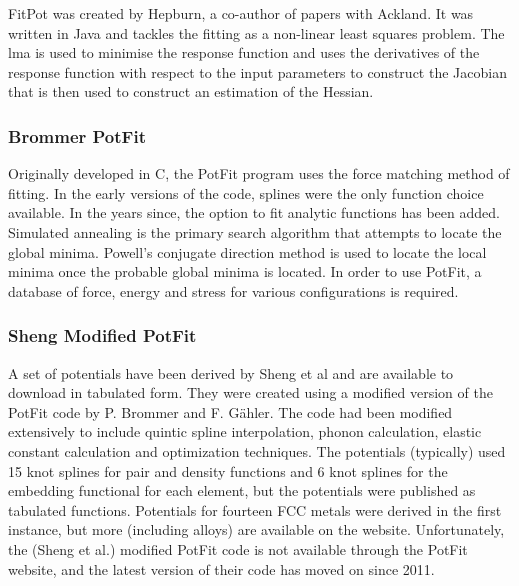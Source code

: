 FitPot was created by Hepburn, a co-author of papers with Ackland\cite{hepburnfec}.  It was written in Java and tackles the fitting as a non-linear least squares problem.  The \acrfull{lma} is used to minimise the response function and uses the derivatives of the response function with respect to the input parameters to construct the Jacobian that is then used to construct an estimation of the Hessian.


\subsubsection{Brommer PotFit}

Originally developed in C, the PotFit\cite{pbrommer} program uses the force matching method of fitting.  In the early versions of the code, splines were the only function choice available.  In the years since, the option to fit analytic functions has been added.  Simulated annealing is the primary search algorithm that attempts to locate the global minima.  Powell's conjugate direction method is used to locate the local minima once the probable global minima is located.  In order to use PotFit, a database of force, energy and stress for various configurations is required.


\subsubsection{Sheng Modified PotFit}
\label{section:shengeampotentials}

A set of potentials have been derived by Sheng et al\cite{shengeam} and are available to download in tabulated form\cite{shengeamonline}.   They were created using a modified version of the PotFit code by P. Brommer and F. G\"ahler\cite{pbrommer}.  The code had been modified extensively to include quintic spline interpolation, phonon calculation, elastic constant calculation and optimization techniques\cite{shengeamonline}.  The potentials (typically) used 15 knot splines for pair and density functions and 6 knot splines for the embedding functional for each element, but the potentials were published as tabulated functions.  Potentials for fourteen FCC metals were derived in the first instance, but more (including alloys) are available on the website.  Unfortunately, the (Sheng et al.) modified PotFit code is not available through the PotFit website\cite{pbrommer}, and the latest version of their code has moved on since 2011.





